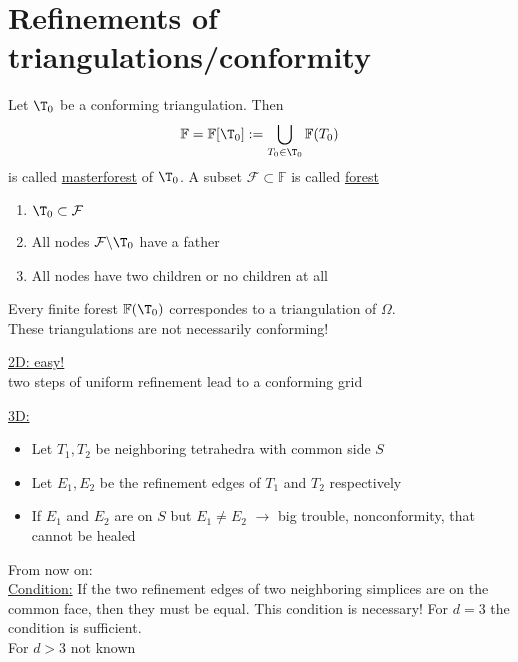 \chapter{Refinements of triangulations/conformity}

\begin{definition}
	Let $\T_{0}$ be a conforming triangulation. Then 
	\begin{equation*}
		\mathbb{F} = \mathbb{F}[\T_{0}]:= \bigcup_{T_{0} \in \T_{0}} \mathbb{F}(T_{0})
	\end{equation*}
	is called \underline{masterforest} of $\T_{0}$.\nl
	A subset $\mathcal{F} \subset \mathbb{F}$ is called \underline{forest}
  	\begin{enumerate}[label= \arabic*)]
    	\item $\T_{0} \subset \mathcal{F}$ 
    	\item All nodes $\mathcal{F} \backslash \T_{0}$ have a father
    	\item All nodes have two children or no children at all
  	\end{enumerate}
	Every finite forest $\mathbb{F}(\T_{0})$ correspondes to a triangulation of $\Omega$.\\
  	These triangulations are not necessarily conforming! 
\end{definition}
\begin{example}
	\underline{2D: easy!} \\
	two steps of uniform refinement lead to a conforming grid
	
	\underline{3D:}
	\begin{itemize}
		\item Let $T_{1},T_{2}$ be neighboring tetrahedra with common side $S$ 
		\item Let $E_{1},E_{2}$ be the refinement edges of $T_{1}$ and $T_{2}$ respectively
		\item If $E_{1}$ and $E_{2}$ are on $S$ but $E_{1}\neq E_{2}$ $\to$ big trouble, nonconformity, that cannot be healed
	\end{itemize}
	
\end{example}
From now on:\\
\underline{Condition:} If the two refinement edges of two neighboring simplices are on the common face, then they must be equal. This condition is necessary!\nl
For $d=3$ the condition is sufficient.\\
For $d>3$ not known\\
